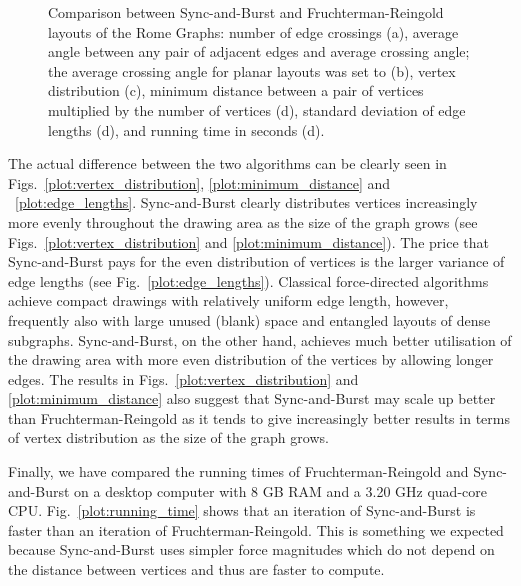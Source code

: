 \documentclass{llncs}
\begin{document}
\begin{figure}
\centering
{}
\caption{Comparison between Sync-and-Burst and Fruchterman-Reingold layouts of the Rome Graphs: number of edge crossings (a), average angle between any pair of adjacent edges and average crossing angle; the average crossing angle for planar layouts was set to  (b), vertex distribution (c), minimum distance between a pair of vertices multiplied by the number of vertices (d), standard deviation of edge lengths (d), and running time in seconds (d).}
\label{fig:plots}
\end{figure}

The actual difference between the two algorithms can be clearly seen in Figs.~\ref{plot:vertex_distribution}, \ref{plot:minimum_distance} and ~\ref{plot:edge_lengths}. Sync-and-Burst clearly distributes vertices increasingly more evenly throughout the drawing area as the size of the graph grows (see Figs.~\ref{plot:vertex_distribution} and \ref{plot:minimum_distance}). The price that Sync-and-Burst pays for the even distribution of vertices is the larger variance of edge lengths (see Fig.~\ref{plot:edge_lengths}). Classical force-directed algorithms achieve compact drawings with relatively uniform edge length, however, frequently also with large unused (blank) space and entangled layouts of dense subgraphs. Sync-and-Burst, on the other hand, achieves much better utilisation of the drawing area with more even distribution of the vertices by allowing longer edges. The results in Figs.~\ref{plot:vertex_distribution} and \ref{plot:minimum_distance} also suggest that Sync-and-Burst may scale up better than Fruchterman-Reingold as it tends to give increasingly better results in terms of vertex distribution as the size of the graph grows.

Finally, we have compared the running times of Fruchterman-Reingold and Sync-and-Burst on a desktop computer with 8 GB RAM and a 3.20 GHz quad-core CPU. Fig.~\ref{plot:running_time} shows that an iteration of Sync-and-Burst is faster than an iteration of Fruchterman-Reingold. This is something we expected because Sync-and-Burst uses simpler force magnitudes which do not depend on the distance between vertices and thus are faster to compute.
\end{document}
